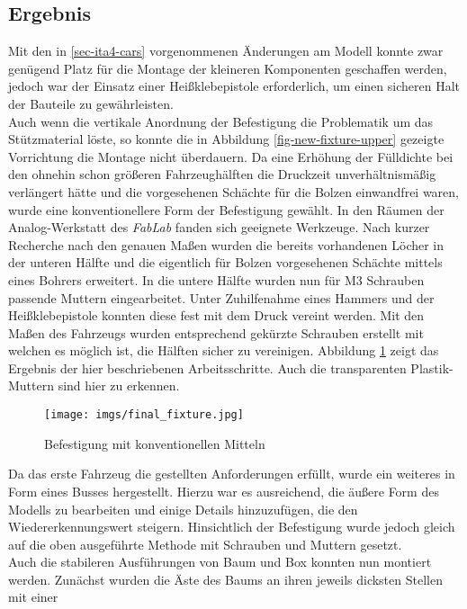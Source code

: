 \documentclass[.../Dokumentation.tex]{subfiles}
\begin{document}
\subsection{Ergebnis}\label{sec-ita4-result}
Mit den in \ref{sec-ita4-cars} vorgenommenen Änderungen am Modell konnte 
zwar genügend Platz für die Montage der kleineren Komponenten geschaffen 
werden, jedoch war der Einsatz einer Heißklebepistole erforderlich, um einen 
sicheren Halt der Bauteile zu gewährleisten.\\
Auch wenn die vertikale Anordnung der Befestigung die Problematik um das 
Stützmateri\-al löste, so konnte die in Abbildung 
\ref{fig-new-fixture-upper} gezeigte Vorrichtung die Montage nicht 
überdauern.
Da eine Erhöhung der Fülldichte bei den ohnehin schon größeren 
Fahrzeughälften die Druckzeit unverhältnismäßig verlängert hätte und die 
vorgesehenen Schächte für die Bolzen einwandfrei waren, wurde eine 
konventionellere Form der Befestigung gewählt. In den Räumen der 
Analog-Werkstatt des \textit{FabLab} fanden sich geeignete Werkzeuge. 
Nach kurzer Recherche nach den 
genauen Maßen wurden die bereits vorhandenen Löcher in der unteren Hälfte und 
die eigentlich für Bolzen vorgesehenen Schächte mittels eines Bohrers erweitert. 
In die untere Hälfte wurden nun für M3 Schrauben passende Muttern eingearbeitet. 
Unter Zuhilfenahme eines Hammers und der 
Heißklebepistole konnten diese fest mit dem Druck vereint werden. Mit 
den Maßen des Fahrzeugs wurden entsprechend gekürzte Schrauben erstellt mit welchen es möglich ist, 
die Hälften sicher zu vereinigen. Abbildung \ref{fig-final-fixture} zeigt das Ergebnis der hier beschriebenen 
Arbeitsschritte. Auch die transparenten Plastik-Muttern sind hier zu erkennen.
\begin{figure}[H]
\begin{center}
    \texttt{[image: imgs/final\_fixture.jpg]}
    \caption{Befestigung mit konventionellen Mitteln}
    \label{fig-final-fixture}
\end{center}
\end{figure}
\noindent 
Da das erste Fahrzeug die gestellten Anforderungen erfüllt, wurde ein weiteres 
in Form eines Busses hergestellt. Hierzu war es ausreichend, die äußere Form 
des Modells zu bearbeiten und einige Details hinzuzufügen, die den 
Wiedererkennungswert steigern. Hinsichtlich der Befestigung wurde jedoch 
gleich auf die oben ausgeführte Methode mit Schrauben und Muttern gesetzt.\\
Auch die stabileren Ausführungen von Baum und Box konnten nun montiert werden. Zunächst wurden die Äste des Baums an ihren jeweils dicksten Stellen mit einer 
\end{document}
